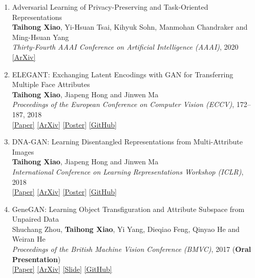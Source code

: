 \documentclass[letterpaper]{article}
\begin{document}
\begin{enumerate}
\item Adversarial Learning of Privacy-Preserving and Task-Oriented Representations\\
	{\bf Taihong Xiao}, Yi-Hsuan Tsai, Kihyuk Sohn, Manmohan Chandraker and Ming-Hsuan Yang\\
	{\it Thirty-Fourth AAAI Conference on Artificial Intelligence (AAAI)}, 2020\\
	\href{https://arxiv.org/abs/1911.10143}{[ArXiv]}
	
\item ELEGANT: Exchanging Latent Encodings with GAN for Transferring Multiple Face Attributes\\
	{\bf Taihong Xiao}, Jiapeng Hong and Jinwen Ma\\
	{\it Proceedings of the European Conference on Computer Vision (ECCV)}, 172--187, 2018\\
	\href{http://openaccess.thecvf.com/content_ECCV_2018/papers/Taihong_Xiao_ELEGANT_Exchanging_Latent_ECCV_2018_paper.pdf}{[Paper]}
	\href{https://arxiv.org/abs/1803.10562}{[ArXiv]}
	\href{https://prinsphield.github.io/ECCV-2018/poster/poster.pdf}{[Poster]}
	\href{https://github.com/Prinsphield/ELEGANT}{[GitHub]}
	
\item DNA-GAN: Learning Disentangled Representations from Multi-Attribute Images\\
	{\bf Taihong Xiao}, Jiapeng Hong and Jinwen Ma\\
	{\it International Conference on Learning Representations Workshop (ICLR)}, 2018\\
	\href{https://openreview.net/pdf?id=rkX1FF_UM}{[Paper]} 
	\href{https://arxiv.org/abs/1711.05415v2}{[ArXiv]}
	\href{https://prinsphield.github.io/ICLR-2018/poster/poster.pdf}{[Poster]}
	\href{https://github.com/Prinsphield/DNA-GAN}{[GitHub]}
	
\item GeneGAN: Learning Object Transfiguration and Attribute Subspace from Unpaired Data\\
	Shuchang Zhou, {\bf Taihong Xiao}, Yi Yang, Dieqiao Feng, Qinyao He and Weiran He\\
	{\it Proceedings of the British Machine Vision Conference (BMVC)}, 2017 ({\bf Oral Presentation})\\
	\href{https://www.dropbox.com/s/3qofizvcfi4pa0f/0520.pdf?dl=1}{[Paper]}
	\href{http://arxiv.org/abs/1705.04932}{[ArXiv]}
	\href{http://zsc.github.io/GeneGAN-BMVC2017.pdf}{[Slide]}
	\href{https://github.com/Prinsphield/GeneGAN}{[GitHub]}


\end{enumerate}
\end{document}
